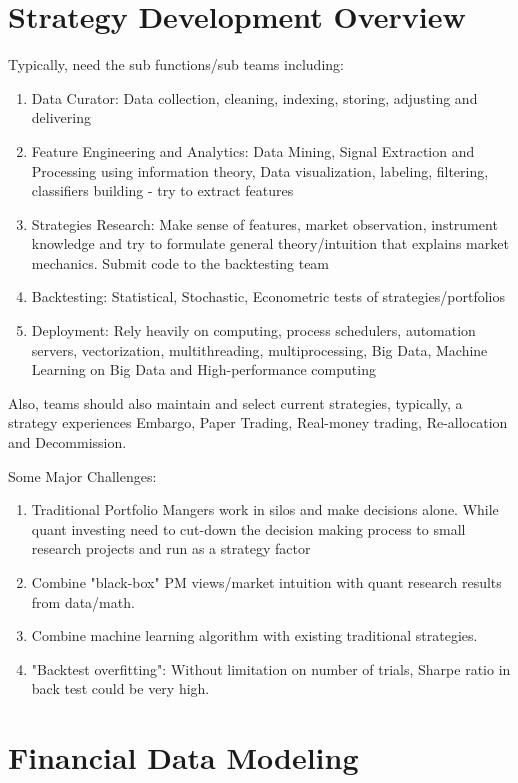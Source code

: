 \documentclass[11pt, openany]{book}              %
\begin{document}
\chapter{Strategy Development Overview}

Typically, need the sub functions/sub teams including:

\begin{enumerate}
 \item Data Curator: Data collection, cleaning, indexing, storing, adjusting and delivering 
 \item Feature Engineering and Analytics: Data Mining, Signal Extraction and Processing using information theory, Data visualization, labeling, filtering, classifiers building - try to extract features
 \item Strategies Research: Make sense of features, market observation, instrument knowledge and try to formulate general theory/intuition that explains market mechanics. Submit code to the backtesting team
 \item Backtesting: Statistical, Stochastic, Econometric tests of strategies/portfolios
 \item Deployment: Rely heavily on computing, process schedulers, automation servers, vectorization, multithreading, multiprocessing, Big Data, Machine Learning on Big Data and High-performance computing 
\end{enumerate}

Also, teams should also maintain and select current strategies, typically, a strategy experiences Embargo, Paper Trading, Real-money trading, Re-allocation and Decommission.

Some Major Challenges:

\begin{enumerate}
 \item Traditional Portfolio Mangers work in silos and make decisions alone. While quant investing need to cut-down the decision making process to small research projects and run as a strategy factor
 \item Combine "black-box" PM views/market intuition with quant research results from data/math. 
 \item Combine machine learning algorithm with existing traditional strategies. 	
 \item "Backtest overfitting": Without limitation on number of trials, Sharpe ratio in back test could be very high. 
\end{enumerate}


\chapter{Financial Data Modeling}
\end{document}
